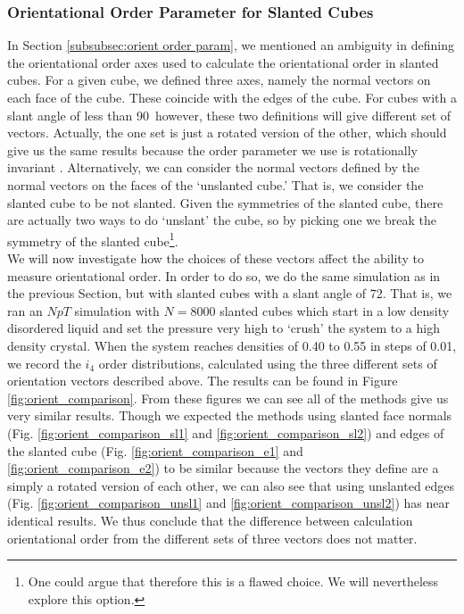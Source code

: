 \documentclass[thesis]{subfiles}
\begin{document}

\subsubsection{Orientational Order Parameter for Slanted Cubes}\label{subsec:orientation vectors}

In Section \ref{subsubsec:orient order param}, we mentioned an ambiguity in defining the orientational order axes used to calculate the orientational order in slanted cubes. For a given cube, we defined three axes, namely the normal vectors on each face of the cube. These coincide with the edges of the cube. For cubes with a slant angle of less than 90\degr\ however, these two definitions will give different set of vectors. Actually, the one set is just a rotated version of the other, which should give us the same results because the order parameter we use is rotationally invariant \cite{steinhardt1983bond}. Alternatively, we can consider the normal vectors defined by the normal vectors on the faces of the `unslanted cube.' That is, we consider the slanted cube to be not slanted. Given the symmetries of the slanted cube, there are actually two ways to do `unslant' the cube, so by picking one we break the symmetry of the slanted cube\footnote{One could argue that therefore this is a flawed choice. We will nevertheless explore this option.}. \\
We will now investigate how the choices of these vectors affect the ability to measure orientational order. In order to do so, we do the same simulation as in the previous Section, but with slanted cubes with a slant angle of 72\degr. That is, we ran an $NpT$ simulation with $N = 8000$ slanted cubes which start in a low density disordered liquid and set the pressure very high to `crush' the system to a high density crystal. When the system reaches densities of 0.40 to 0.55 in steps of 0.01, we record the $i_4$ order distributions, calculated using the three different sets of orientation vectors described above. The results can be found in Figure \ref{fig:orient_comparison}.
From these figures we can see all of the methods give us very similar results. Though we expected the methods using slanted face normals (Fig. \ref{fig:orient_comparison_sl1} and \ref{fig:orient_comparison_sl2}) and edges of the slanted cube (Fig. \ref{fig:orient_comparison_e1} and \ref{fig:orient_comparison_e2}) to be similar because the vectors they define are a simply a rotated version of each other, we can also see that using unslanted edges (Fig. \ref{fig:orient_comparison_unsl1} and \ref{fig:orient_comparison_unsl2}) has near identical results. We thus conclude that the difference between calculation orientational order from the different sets of three vectors does not matter.
\end{document}
